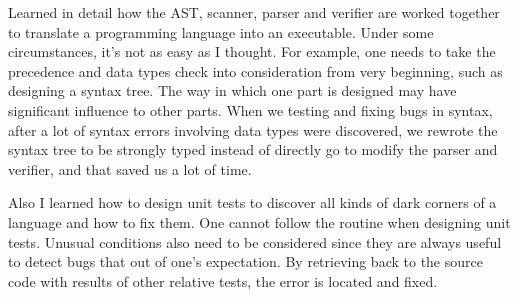 Learned in detail how the AST, scanner, parser and verifier are worked together to translate a programming language into an executable. Under some circumstances, it’s not as easy as I thought. For example, one needs to take the precedence and data types check into consideration from very beginning, such as designing a syntax tree. The way in which one part is designed may have significant influence to other parts. When we testing and fixing bugs in syntax, after a lot of syntax errors involving data types were discovered, we rewrote the syntax tree to be strongly typed instead of directly go to modify the parser and verifier, and that saved us a lot of time.

Also I learned how to design unit tests to discover all kinds of dark corners of a language and how to fix them. One cannot follow the routine when designing unit tests. Unusual conditions also need to be considered since they are always useful to detect bugs that out of one’s expectation. By retrieving back to the source code with results of other relative tests, the error is located and fixed.
